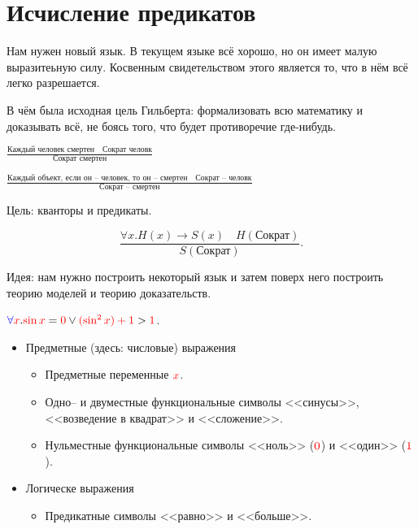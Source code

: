 \section{Исчисление предикатов}

Нам нужен новый язык. В текущем языке всё хорошо, но он имеет малую выразитеьную силу. Косвенным свидетельством этого является то, что в нём всё легко разрешается.

В чём была исходная цель Гильберта: формализовать всю математику и доказывать всё, не боясь того, что будет противоречие где-нибудь.


\begin{example}
    $\frac{\text{Каждый человек смертен}\quad  \text{Сократ человк}}{\text{Сократ смертен}}$

    $\frac{\text{Каждый объект, если он -- человек, то он -- смертен}\quad  \text{Сократ -- человк}}{\text{Сократ -- смертен}}$

    Цель: {\color{blue} кванторы} и {\color{red}предикаты}.

    \[
    \frac{\forall x.H(x) \to S(x)\quad H(\text{Сократ})}{S(\text{Сократ})}
    .\]
\end{example}

Идея: нам нужно построить некоторый язык и затем поверх него построить теорию моделей и теорию доказательств.

\begin{example}
    ${\color{blue} \forall} {\color{red}x}. {\color{red}\sin x} = {\color{red}0} \lor {\color{red}(\sin^2 x) + 1} > {\color{red}1}$.

    \begin{itemize}
        \item Предметные (здесь: числовые) выражения
        \begin{itemize}
            \item Предметные переменные ${\color{red}x}$.
            \item Одно-- и двуместные функциональные символы <<синусы>>, <<возведение в квадрат>> и <<сложение>>.
            \item  Нульместные функциональные символы <<ноль>> ($\color{red}0$) и <<один>> ($\color{red}1$).
        \end{itemize}
        \item Логическе выражения
        \begin{itemize}
            \item Предикатные символы <<равно>> и <<больше>>.
        \end{itemize}
    \end{itemize}
\end{example}

